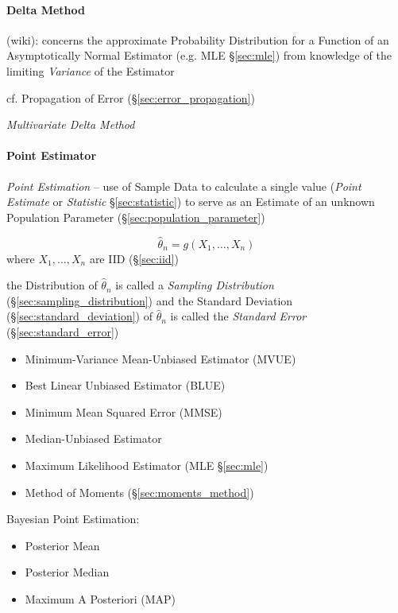 \paragraph{Delta Method}\label{sec:delta_method}\hfill

(wiki): concerns the approximate Probability Distribution for a Function of an
Asymptotically Normal Estimator (e.g. MLE \S\ref{sec:mle}) from knowledge of the
limiting \emph{Variance} of the Estimator

\fist cf. Propagation of Error (\S\ref{sec:error_propagation})

\emph{Multivariate Delta Method}



\paragraph{Point Estimator}\label{sec:point_estimator}\hfill

\emph{Point Estimation} -- use of Sample Data to calculate a single value
(\emph{Point Estimate} or \emph{Statistic} \S\ref{sec:statistic}) to serve as an
Estimate of an unknown Population Parameter (\S\ref{sec:population_parameter})

\[
  \hat{\theta}_n = g(X_1, \ldots, X_n)
\]
where $X_1, \ldots, X_n$ are IID (\S\ref{sec:iid})

the Distribution of $\hat{\theta}_n$ is called a \emph{Sampling Distribution}
(\S\ref{sec:sampling_distribution}) and the Standard Deviation
(\S\ref{sec:standard_deviation}) of $\hat{\theta}_n$ is called the
\emph{Standard Error} (\S\ref{sec:standard_error})

\begin{itemize}
  \item Minimum-Variance Mean-Unbiased Estimator (MVUE)
  \item Best Linear Unbiased Estimator (BLUE)
  \item Minimum Mean Squared Error (MMSE)
  \item Median-Unbiased Estimator
  \item Maximum Likelihood Estimator (MLE \S\ref{sec:mle})
  \item Method of Moments (\S\ref{sec:moments_method})
\end{itemize}

Bayesian Point Estimation:
\begin{itemize}
  \item Posterior Mean
  \item Posterior Median
  \item Maximum A Posteriori (MAP)
\end{itemize}

